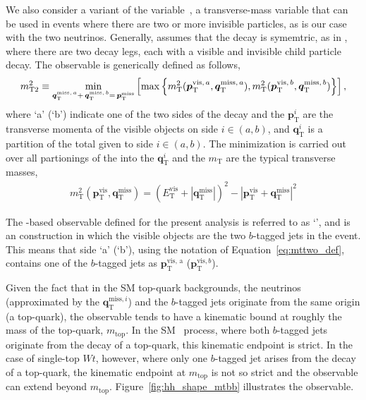 We also consider a variant of the \mttwo variable~\cite{MT2-Glamour,Lester2011,MT2-Tovey-Masses,Lester2014yga},
a transverse-mass variable that can be used in events where there are two or more invisible particles,
as is our case with the two neutrinos.
Generally, \mttwo assumes that the decay is symemtric, as in \ttbar, where there are two decay legs, each with
a visible and invisible child particle decay.
The \mttwo observable is generically defined as follows,
\begin{align}
    m_{\text{T2}}^2 \equiv \min\limits_{ \bm{q}_{\text{T}}^{\text{miss},\,a} + \, \bm{q}_{\text{T}}^{\text{miss},\,b} = \,\bm{p}_{\text{T}}^{\text{miss}}}
        \left[
            \max
                \left\{
                    m_{\text{T}}^2 ( \bm{p}_{\text{T}}^{\text{vis},\, a}, \bm{q}_{\text{T}}^{\text{miss},\,a} ), m_{\text{T}}^2 (\bm{p}_{\text{T}}^{\text{vis},\, b}, \bm{q}_{\text{T}}^{\text{miss},\,b} )
                \right\}
        \right],
    \label{eq:mttwo_def}
\end{align}
where `a' (`b') indicate one of the two sides of the decay and the $\bm{p}_{\text{T}}^i$ are the transverse momenta
of the visible objects on side $i \in (a,b)$, and $\bm{q}_{\text{T}}^i$ is a partition of the total \ptmiss given to side $i \in (a,b)$.
The minimization is carried out over all partionings of the \ptmiss into the $\bm{q}_{\text{T}}^i$ and the $m_{\text{T}}$ are the typical
transverse masses,
\begin{align}
    m_{\text{T}}^2 (\bm{p}_{\text{T}}^{\text{vis}}, \bm{q}_{\text{T}}^{\text{miss}} ) = ( E_{\text{T}}^{\text{vis}} + | \bm{q}_{\text{T}}^{\text{miss}} |)^2
            - |\bm{p}_{\text{T}}^{\text{vis}} + \bm{q}_{\text{T}}^{\text{miss}} |^2
    \label{eq:mt_def}
\end{align}

The \mttwo-based observable defined for the present analysis is referred to as `\mtbb',
and is an \mttwo construction in which the visible objects are the two $b$-tagged jets in the event.
This means that side `a' (`b'), using the notation of Equation~\ref{eq:mttwo_def}, contains
one of the $b$-tagged jets as $\bm{p}_{\text{T}}^{\text{vis, a}}$ ($\bm{p}_{\text{T}}^{\text{vis}, b}$).

Given the fact that in the SM top-quark backgrounds, the neutrinos (approximated by the $\bm{q}_{\text{T}}^{\text{miss}, i}$)
and the $b$-tagged jets originate from the same origin (a top-quark), the \mtbb observable tends
to have a kinematic bound at roughly the mass of the top-quark, $m_{\text{top}}$.
In the SM \ttbar~process, where both $b$-tagged jets originate from the decay of a top-quark, this kinematic
endpoint is strict.
In the case of single-top $Wt$, however, where only one $b$-tagged jet arises from the decay of a
top-quark, the kinematic endpoint at $m_{\text{top}}$ is not so strict and the \mtbb observable can extend beyond $m_{\text{top}}$.
Figure~\ref{fig:hh_shape_mtbb} illustrates the \mtbb observable.

